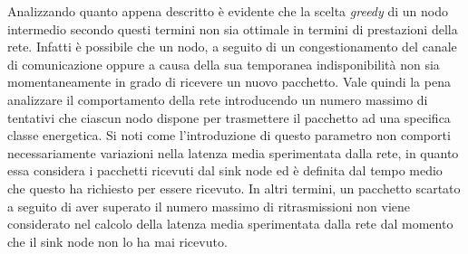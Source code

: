 \documentclass[binding=0.6cm,TFA]{sapthesis}
\begin{document}
Analizzando quanto appena descritto è evidente che la scelta \emph{greedy} di un nodo intermedio secondo questi termini non sia ottimale in termini di prestazioni
della rete. Infatti è possibile che un nodo, a seguito di un congestionamento del canale di comunicazione oppure a causa della sua temporanea indisponibilità
non sia momentaneamente in grado di ricevere un nuovo pacchetto. Vale quindi la pena analizzare il comportamento della rete introducendo un numero massimo di
tentativi che ciascun nodo dispone per trasmettere il pacchetto ad una specifica classe energetica. Si noti come l'introduzione di questo parametro non
comporti necessariamente variazioni nella latenza media sperimentata dalla rete, in quanto essa considera i pacchetti ricevuti dal sink node ed è definita
dal tempo medio che questo ha richiesto per essere ricevuto. In altri termini, un pacchetto scartato a seguito di aver superato il numero massimo
di ritrasmissioni non viene considerato nel calcolo della latenza media sperimentata dalla rete dal momento che il sink node non lo ha mai ricevuto.
\end{document}
